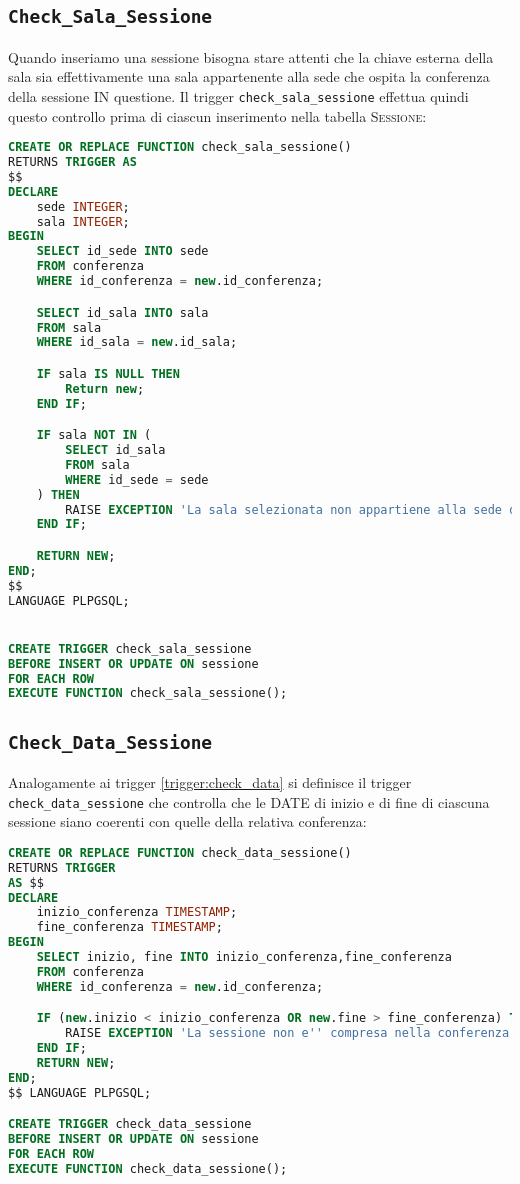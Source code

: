 \subsection{\texttt{Check\_Sala\_Sessione}}
Quando inseriamo una sessione bisogna stare attenti che la chiave esterna della sala sia effettivamente una sala appartenente alla sede che ospita la conferenza della sessione IN questione. Il trigger \texttt{check\_sala\_sessione} effettua quindi questo controllo prima di ciascun inserimento nella tabella \textsc{Sessione}:
\begin{lstlisting}[language=SQL, style=mystyle]
CREATE OR REPLACE FUNCTION check_sala_sessione() 
RETURNS TRIGGER AS 
$$
DECLARE
	sede INTEGER;
	sala INTEGER;
BEGIN
	SELECT id_sede INTO sede
	FROM conferenza
	WHERE id_conferenza = new.id_conferenza;

	SELECT id_sala INTO sala
	FROM sala
	WHERE id_sala = new.id_sala;

	IF sala IS NULL THEN
		Return new;
	END IF;

	IF sala NOT IN (
		SELECT id_sala
		FROM sala
		WHERE id_sede = sede
	) THEN
		RAISE EXCEPTION 'La sala selezionata non appartiene alla sede della conferenza';
	END IF;

	RETURN NEW;
END;
$$ 
LANGUAGE PLPGSQL;


CREATE TRIGGER check_sala_sessione
BEFORE INSERT OR UPDATE ON sessione
FOR EACH ROW
EXECUTE FUNCTION check_sala_sessione();
\end{lstlisting}
\subsection{\texttt{Check\_Data\_Sessione}}
Analogamente ai trigger \ref{trigger:check_data} si definisce il trigger \texttt{check\_data\_sessione} che controlla che le DATE di inizio e di fine di ciascuna sessione siano coerenti con quelle della relativa conferenza:
\begin{lstlisting}[language=SQL, style=mystyle, caption={\texttt{check\_data\_sessione}}]
CREATE OR REPLACE FUNCTION check_data_sessione() 
RETURNS TRIGGER 
AS $$
DECLARE
	inizio_conferenza TIMESTAMP;
	fine_conferenza TIMESTAMP;
BEGIN
	SELECT inizio, fine INTO inizio_conferenza,fine_conferenza
	FROM conferenza
	WHERE id_conferenza = new.id_conferenza;

	IF (new.inizio < inizio_conferenza OR new.fine > fine_conferenza) THEN
		RAISE EXCEPTION 'La sessione non e'' compresa nella conferenza';
	END IF;
	RETURN NEW;
END;
$$ LANGUAGE PLPGSQL;

CREATE TRIGGER check_data_sessione
BEFORE INSERT OR UPDATE ON sessione
FOR EACH ROW
EXECUTE FUNCTION check_data_sessione();
\end{lstlisting}
